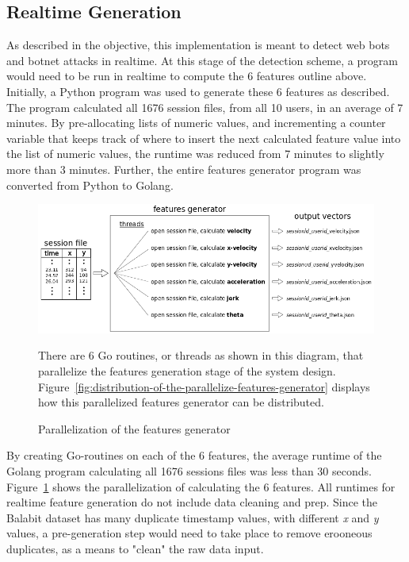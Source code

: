 \subsection{Realtime Generation}\label{subsec:realtime-generation}
As described in the objective, this implementation is meant to detect web bots and botnet attacks in realtime.
At this stage of the detection scheme, a program would need to be run in realtime to compute the 6 features outline above.
Initially, a Python program was used to generate these 6 features as described.
The program calculated all 1676 session files, from all 10 users, in an average of 7 minutes.
By pre-allocating lists of numeric values, and incrementing a counter variable that keeps track of where to insert the next calculated feature value into the list of numeric values, the runtime was reduced from 7 minutes to slightly more than 3 minutes.
Further, the entire features generator program was converted from Python to Golang.

\begin{figure}[!h]
    \centering
    \includegraphics[width=1\columnwidth]{figures/parallelized_features_generator}
    \caption{Parallelization of the features generator}
    \label{fig:parallelization-of-the-features-generator-implementation-version}
    {\small There are 6 Go routines, or threads as shown in this diagram, that parallelize the features generation stage of the system design. Figure~\ref{fig:distribution-of-the-parallelize-features-generator} displays how this parallelized features generator can be distributed.}
\end{figure}

By creating Go-routines on each of the 6 features, the average runtime of the Golang program calculating all 1676 sessions files was less than 30 seconds.
Figure~\ref{fig:parallelization-of-the-features-generator-implementation-version} shows the parallelization of calculating the 6 features.
All runtimes for realtime feature generation do not include data cleaning and prep.
Since the Balabit dataset has many duplicate timestamp values, with different \textit{x} and \textit{y} values, a pre-generation step would need to take place to remove erooneous duplicates, as a means to "clean" the raw data input.

